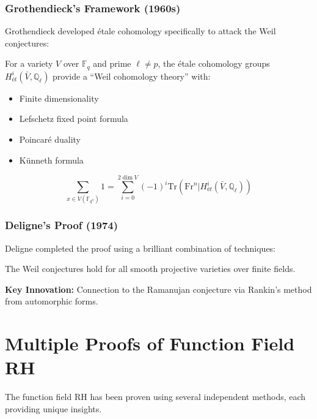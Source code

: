 \subsubsection{Grothendieck's Framework (1960s)}

Grothendieck developed étale cohomology specifically to attack the Weil conjectures:

\begin{definition}
For a variety $V$ over $\mathbb{F}_q$ and prime $\ell \neq p$, the étale cohomology groups $H^i_{ét}(\bar{V}, \mathbb{Q}_\ell)$ provide a ``Weil cohomology theory'' with:
\begin{itemize}
\item Finite dimensionality
\item Lefschetz fixed point formula
\item Poincaré duality
\item Künneth formula
\end{itemize}
\end{definition}

\begin{theorem}
\begin{equation}
\sum_{x \in V(\mathbb{F}_{q^n})} 1 = \sum_{i=0}^{2\dim V} (-1)^i \text{Tr}(\text{Fr}^n | H^i_{ét}(\bar{V}, \mathbb{Q}_\ell))
\end{equation}
\end{theorem}

\subsubsection{Deligne's Proof (1974)}

Deligne completed the proof using a brilliant combination of techniques:

\begin{theorem}[Deligne, 1974]
\label{thm:deligne}
The Weil conjectures hold for all smooth projective varieties over finite fields.
\end{theorem}

\textbf{Key Innovation:} Connection to the Ramanujan conjecture via Rankin's method from automorphic forms.

\section{Multiple Proofs of Function Field RH}
\label{sec:multiple_proofs}

The function field RH has been proven using several independent methods, each providing unique insights.

